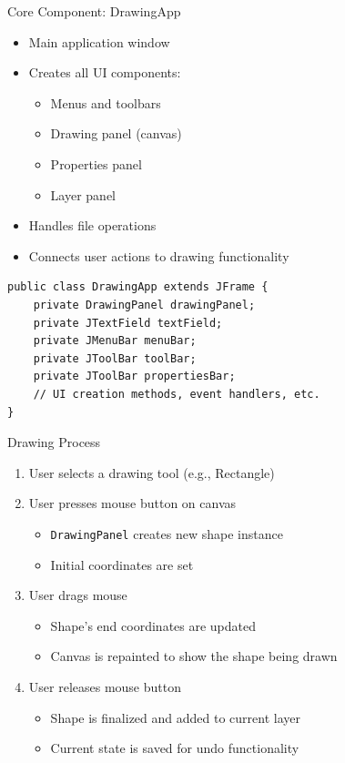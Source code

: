 \documentclass{beamer}
\begin{document}
\begin{frame}[fragile]{Core Component: DrawingApp}
\begin{itemize}
\item Main application window
\item Creates all UI components:
  \begin{itemize}
  \item Menus and toolbars
  \item Drawing panel (canvas)
  \item Properties panel
  \item Layer panel
  \end{itemize}
\item Handles file operations
\item Connects user actions to drawing functionality
\end{itemize}

\begin{verbatim}
public class DrawingApp extends JFrame {
    private DrawingPanel drawingPanel;
    private JTextField textField;
    private JMenuBar menuBar;
    private JToolBar toolBar;
    private JToolBar propertiesBar;
    // UI creation methods, event handlers, etc.
}
\end{verbatim}
\end{frame}

\begin{frame}{Drawing Process}
\begin{enumerate}
\item User selects a drawing tool (e.g., Rectangle)
\item User presses mouse button on canvas
  \begin{itemize}
  \item \texttt{DrawingPanel} creates new shape instance
  \item Initial coordinates are set
  \end{itemize}
\item User drags mouse
  \begin{itemize}
  \item Shape's end coordinates are updated
  \item Canvas is repainted to show the shape being drawn
  \end{itemize}
\item User releases mouse button
  \begin{itemize}
  \item Shape is finalized and added to current layer
  \item Current state is saved for undo functionality
  \end{itemize}
\end{enumerate}
\end{frame}
\end{document}
